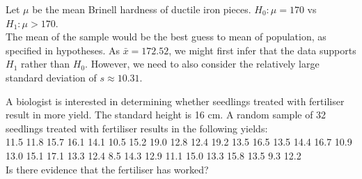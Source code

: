 \documentclass[bigtut]{tutorial}\usepackage[]{graphicx}\usepackage[]{color}
\makeatletter
\newcommand{\hlstd}[1]{\textcolor[rgb]{0.345,0.345,0.345}{#1}}%
\newcommand{\hlkwd}[1]{\textcolor[rgb]{0.737,0.353,0.396}{\textbf{#1}}}%
\newenvironment{kframe}{%
 \def\at@end@of@kframe{}%
 \ifinner\ifhmode%
  \def\at@end@of@kframe{\end{minipage}}%
  \begin{minipage}{\columnwidth}%
 \fi\fi%
 \def\FrameCommand##1{\hskip\@totalleftmargin \hskip-\fboxsep
 \colorbox{shadecolor}{##1}\hskip-\fboxsep
     \hskip-\linewidth \hskip-\@totalleftmargin \hskip\columnwidth}%
 \MakeFramed {\advance\hsize-\width
   \@totalleftmargin\z@ \linewidth\hsize
   \@setminipage}}%
 {\par\unskip\endMakeFramed%
 \at@end@of@kframe}
\newenvironment{knitrout}{}{} %
\makeatother
\begin{document}
\begin{tutorial}
\begin{questions}

\begin{solution}

Let $\mu$ be the mean Brinell hardness of ductile iron pieces.
$H_{0}: \mu = 170$ vs $H_{1}: \mu > 170$. \\

The mean of the sample would be the best guess to mean of population, as specified in hypotheses. As  $\bar{x}= 172.52$, we might first infer that the data supports $H_{1}$ rather than $H_{0}$. However, we need to also consider the relatively large standard deviation of $s \approx 10.31$.
\end{solution}




\question
A biologist is interested in determining whether seedlings treated with fertiliser result in more yield. The standard height is 16 cm. A random sample of 32 seedlings treated with fertiliser results in the following yields: \\

11.5  11.8	15.7	16.1	14.1	10.5 15.2	19.0	12.8	12.4	19.2	13.5 16.5	13.5	14.4	16.7	10.9	13.0 15.1	17.1	13.3	12.4	8.5	14.3 12.9	11.1	15.0	13.3	15.8	13.5 9.3	12.2		 \\ 	 

Is there evidence that the fertiliser has worked?


\end{questions}
\end{tutorial}
\end{document}
